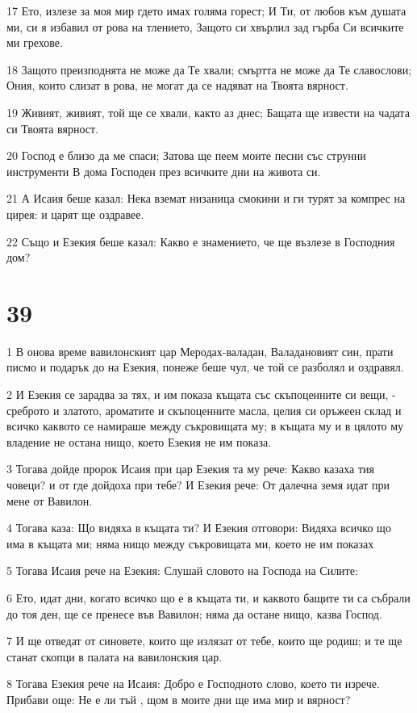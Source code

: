 \par 17 Ето, излезе за моя мир гдето имах голяма горест; И Ти, от любов към душата ми, си я избавил от рова на тлението, Защото си хвърлил зад гърба Си всичките ми грехове.
\par 18 Защото преизподнята не може да Те хвали; смъртта не може да Те славослови; Ония, които слизат в рова, не могат да се надяват на Твоята вярност.
\par 19 Живият, живият, той ще се хвали, както аз днес; Бащата ще извести на чадата си Твоята вярност.
\par 20 Господ е близо да ме спаси; Затова ще пеем моите песни със струнни инструменти В дома Господен през всичките дни на живота си.
\par 21 А Исаия беше казал: Нека вземат низаница смокини и ги турят за компрес на цирея: и царят ще оздравее.
\par 22 Също и Езекия беше казал: Какво е знамението, че ще възлезе в Господния дом?

\chapter{39}

\par 1 В онова време вавилонският цар Меродах-валадан, Валадановият син, прати писмо и подарък до на Езекия, понеже беше чул, че той се разболял и оздравял.
\par 2 И Езекия се зарадва за тях, и им показа къщата със скъпоценните си вещи, - среброто и златото, ароматите и скъпоценните масла, целия си оръжеен склад и всичко каквото се намираше между съкровищата му; в къщата му и в цялото му владение не остана нищо, което Езекия не им показа.
\par 3 Тогава дойде пророк Исаия при цар Езекия та му рече: Какво казаха тия човеци? и от где дойдоха при тебе? И Езекия рече: От далечна земя идат при мене от Вавилон.
\par 4 Тогава каза: Що видяха в къщата ти? И Езекия отговори: Видяха всичко що има в къщата ми; няма нищо между съкровищата ми, което не им показах
\par 5 Тогава Исаия рече на Езекия: Слушай словото на Господа на Силите:
\par 6 Ето, идат дни, когато всичко що е в къщата ти, и каквото бащите ти са събрали до тоя ден, ще се пренесе във Вавилон; няма да остане нищо, казва Господ.
\par 7 И ще отведат от синовете, които ще излязат от тебе, които ще родиш; и те ще станат скопци в палата на вавилонския цар.
\par 8 Тогава Езекия рече на Исаия: Добро е Господното слово, което ти изрече. Прибави още: Не е ли тъй , щом в моите дни ще има мир и вярност?

